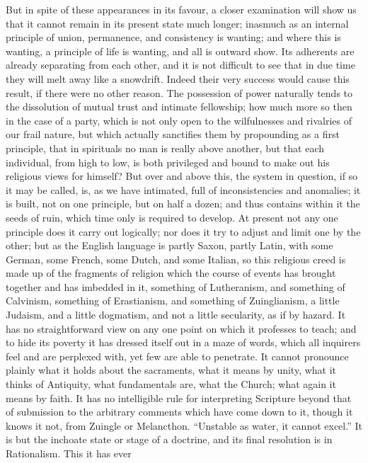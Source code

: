 But in spite of these appearances in its favour,
a closer examination will show us that it cannot remain in its present
state much longer; inasmuch as an internal principle of union,
permanence, and consistency is wanting; and where this is wanting, a
principle of life is wanting, and all is outward show. Its adherents
are already separating from each other, and it is not difficult to see
that in due time they will melt away like a snowdrift. Indeed their
very success would cause this result, if there were no other reason.
The possession of power naturally tends to the dissolution of mutual
trust and intimate fellowship; how much more so then in the case of a
party, which is not only open to the wilfulnesses and rivalries of our
frail nature, but which actually sanctifies them by propounding as a
first principle, that in spirituals no man is really above another,
but that each individual, from high to low, is both privileged and
bound to make out his religious views for himself? But over and above
this, the system in question, if so it may be called, is, as we have
intimated, full of inconsistencies and anomalies; it is built, not on
one principle, but on half a dozen; and thus contains within it the
seeds of ruin, which time only is required to develop. At present not
any one principle does it carry out logically; nor does it try to
adjust and limit one by the other; but as the English language is
partly Saxon, partly Latin, with some German, some French, some Dutch,
and some Italian, so this religious creed is made up of the fragments
of religion which the course of events has brought together and has
imbedded in it, something of Lutheranism, and something of Calvinism,
something of Erastianism, and something of Zuinglianism, a little
Judaism, and a little dogmatism, and not a little secularity, as
if by hazard. It has no straightforward view on any one point on which
it professes to teach; and to hide its poverty it has dressed itself
out in a maze of words, which all inquirers feel and are perplexed
with, yet few are able to penetrate. It cannot pronounce plainly what
it holds about the sacraments, what it means by unity, what it thinks
of Antiquity, what fundamentals are, what the Church; what again it
means by faith. It has no intelligible rule for interpreting Scripture
beyond that of submission to the arbitrary comments which have come
down to it, though it knows it not, from Zuingle or Melancthon. ``Unstable
as water, it cannot excel.'' It is but the inchoate state or stage of a
doctrine, and its final resolution is in Rationalism. This it has ever
